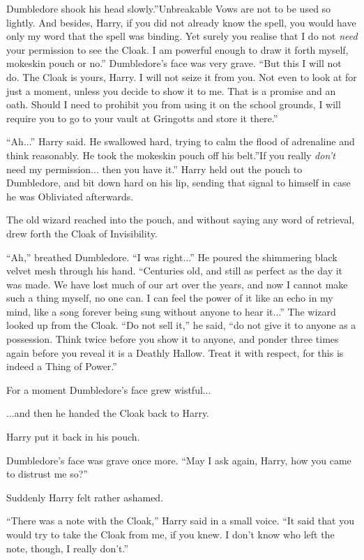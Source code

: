 Dumbledore shook his head slowly.''Unbreakable Vows are not to be used
so lightly. And besides, Harry, if you did not already know the spell,
you would have only my word that the spell was binding. Yet surely you
realise that I do not \emph{need} your permission to see the Cloak. I am
powerful enough to draw it forth myself, mokeskin pouch or no.''
Dumbledore's face was very grave. ``But this I will not do. The Cloak is
yours, Harry. I will not seize it from you. Not even to look at for just
a moment, unless you decide to show it to me. That is a promise and an
oath. Should I need to prohibit you from using it on the school grounds,
I will require you to go to your vault at Gringotts and store it
there.''

``Ah...'' Harry said. He swallowed hard, trying to calm the flood
of adrenaline and think reasonably. He took the mokeskin pouch off his
belt.''If you really \emph{don't} need my permission... then you
have it.'' Harry held out the pouch to Dumbledore, and bit down hard on
his lip, sending that signal to himself in case he was Obliviated
afterwards.

The old wizard reached into the pouch, and without saying any word of
retrieval, drew forth the Cloak of Invisibility.

``Ah,'' breathed Dumbledore. ``I was right...'' He poured the
shimmering black velvet mesh through his hand. ``Centuries old, and
still as perfect as the day it was made. We have lost much of our art
over the years, and now I cannot make such a thing myself, no one can. I
can feel the power of it like an echo in my mind, like a song forever
being sung without anyone to hear it...'' The wizard looked up from
the Cloak. ``Do not sell it,'' he said, ``do not give it to anyone as a
possession. Think twice before you show it to anyone, and ponder three
times again before you reveal it is a Deathly Hallow. Treat it with
respect, for this is indeed a Thing of Power.''

For a moment Dumbledore's face grew wistful...

...and then he handed the Cloak back to Harry.

Harry put it back in his pouch.

Dumbledore's face was grave once more. ``May I ask again, Harry, how you
came to distrust me so?''

Suddenly Harry felt rather ashamed.

``There was a note with the Cloak,'' Harry said in a small voice. ``It
said that you would try to take the Cloak from me, if you knew. I don't
know who left the note, though, I really don't.''

